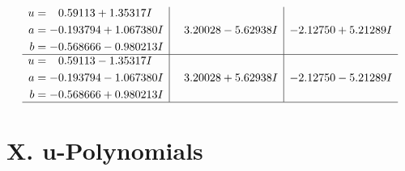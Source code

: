 \documentclass[1p]{elsarticle_modified}
\theoremstyle{definition}
\begin{document}
$$\begin{array}{c|c|c}
\begin{aligned}
u &= \phantom{-}0.59113 + 1.35317 I \\
a &= -0.193794 + 1.067380 I \\
b &= -0.568666 - 0.980213 I\end{aligned}
 & \phantom{-}3.20028 - 5.62938 I & -2.12750 + 5.21289 I \\ \hline\begin{aligned}
u &= \phantom{-}0.59113 - 1.35317 I \\
a &= -0.193794 - 1.067380 I \\
b &= -0.568666 + 0.980213 I\end{aligned}
 & \phantom{-}3.20028 + 5.62938 I & -2.12750 - 5.21289 I\\
 \hline 
 \end{array}$$\newpage
\newpage\renewcommand{\arraystretch}{1}
\centering \section*{ X. u-Polynomials}
\end{document}
